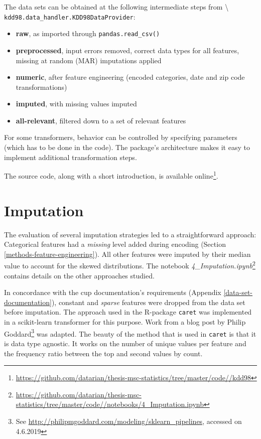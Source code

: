 \documentclass[
  11pt,
  a4paper,
  DIV=12,captions=tableheading,oneside,titlepage]{scrbook}
\providecommand{\tightlist}{%
  \setlength{\itemsep}{0pt}\setlength{\parskip}{0pt}}
\begin{document}
The data sets can be obtained at the following intermediate steps from \textbackslash{} \texttt{kdd98.data\_handler.KDD98DataProvider}:

\begin{itemize}
\tightlist
\item
  \textbf{raw}, as imported through \texttt{pandas.read\_csv()}
\item
  \textbf{preprocessed}, input errors removed, correct data types for all features, missing at random (MAR) imputations applied
\item
  \textbf{numeric}, after feature engineering (encoded categories, date and zip code transformations)
\item
  \textbf{imputed}, with missing values imputed
\item
  \textbf{all-relevant}, filtered down to a set of relevant features
\end{itemize}

For some transformers, behavior can be controlled by specifying parameters (which has to be done in the code). The package's architecture makes it easy to implement additional transformation steps.

The source code, along with a short introduction, is available online\footnote{\url{https://github.com/datarian/thesis-msc-statistics/tree/master/code//kdd98}}.

\hypertarget{imputation-1}{%
\section{Imputation}\label{imputation-1}}

The evaluation of several imputation strategies led to a straightforward approach: Categorical features had a \emph{missing} level added during encoding (Section \ref{methods-feature-engineering}). All other features were imputed by their median value to account for the skewed distributions. The notebook \emph{4\_Imputation.ipynb}\footnote{\url{https://github.com/datarian/thesis-msc-statistics/tree/master/code//notebooks/4_Imputation.ipynb}} contains details on the other approaches studied.

In concordance with the cup documentation's requirements (Appendix \ref{data-set-documentation}), constant and \emph{sparse} features were dropped from the data set before imputation. The approach used in the R-package \texttt{caret} was implemented in a scikit-learn transformer for this purpose. Work from a blog post by Philip Goddard\footnote{See \url{http://philipmgoddard.com/modeling/sklearn_pipelines}, accessed on 4.6.2019} was adapted. The beauty of the method that is used in \texttt{caret} is that it is data type agnostic. It works on the number of unique values per feature and the frequency ratio between the top and second values by count.
\end{document}
